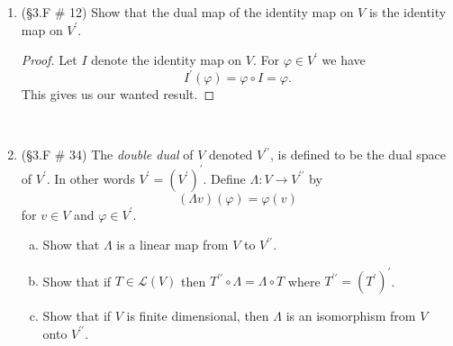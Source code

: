 \documentclass[12pt,letterpaper]{article}
\theoremstyle{plain}
\newtheorem*{claim}{Claim}
\theoremstyle{definition}
\begin{document}
\begin{enumerate}[1.]
\begin{proof}
\ \\
\hrule
\begin{claim} \[U^0=\text{span}\{\varphi_{p+1}, \ldots, \varphi_n\}.\]
\end{claim}
\hrule
\ \\
Under our relabeling we have that $\text{dim}(U)=p$ and $\text{dim}(U^0)=m$ this will imply our wanted result. We note that if $v\in V$ then $v=\alpha_1b_1+\ldots + \alpha_nb_n$ and  
\[\varphi_j(v)=\varphi_j(\alpha_1b_1+\ldots +\alpha_jb_j+\ldots +\alpha_nb_n)=\alpha_j.\] Suppose $\varphi\in \text{span}\{\varphi_{p+1}, \ldots, \varphi_n\}$ then 
\[\varphi=c_{p+1}\varphi_{p+1}+\ldots +c_n\varphi_{n}\] for some scalars $c_{p+1}, \ldots, c_n\in \mathbb{F}$. If $u\in U$ then 
\[u=\alpha_1b_1+\ldots+\alpha_pb_p+0b_{p+1}+\ldots+0b_n.\]
If we apply $\varphi$ then $\varphi(u)=0$ and hence $\varphi\in U^0$. 

Now suppose that $\varphi\in U^0$. There exists scalars $c_1, \ldots, c_n$ such that 
\[\varphi=c_1\varphi_1+\ldots+c_n\varphi_n.\] Since $\{b_1, \ldots, b_p\}$ is a basis for $U$ and $\varphi \in U^0$ we have that for $1\leq j\leq p$ 
\[0=\varphi(b_j)=(c_1\varphi_1+\ldots +c_j\varphi_j+\ldots+c_n\varphi_n)(b_j)=c_j.\]
Hence 
\[U^0\ni \varphi=c_{p+1}\varphi_{p+1}+\ldots c_n\varphi_n\]
and $U^0\subset \text{span}\{\varphi_{p+1}, \ldots, \varphi_n\}$
\end{proof}
\ \\
\newpage
\item (\S 3.F \# 12) Show that the dual map of the identity map on $V$ is the identity map on $V^\prime$. \\
\begin{proof} Let $I$ denote the identity map on $V$. For $\varphi\in V^\prime$ we have 
\[I^\prime(\varphi)=\varphi\circ I=\varphi.\]
This gives us our wanted result. 
\end{proof}
\ \\
\item (\S 3.F \# 34) The \emph{double dual} of $V$ denoted $V^{\prime\prime}$, is defined to be the dual space of $V^\prime$. In other words $V^{\prime}=(V^\prime)^\prime$. Define $\Lambda:V\rightarrow V^{\prime\prime}$ by 
\[(\Lambda v) (\varphi)=\varphi(v)\]
for $v\in V$ and $\varphi \in V^\prime$. 
\begin{enumerate}[(a)]
\item Show that $\Lambda$ is a linear map from $V$ to $V^{\prime\prime}$. 
\item Show that if $T\in \mathcal{L}(V)$ then $T^{\prime\prime}\circ \Lambda=\Lambda\circ T$ where $T^{\prime\prime}=(T^\prime)^\prime$. 
\item Show that if $V$ is finite dimensional, then $\Lambda$ is an isomorphism from $V$ onto $V^{\prime\prime}$.
\end{enumerate}
\end{enumerate}
\end{document}
